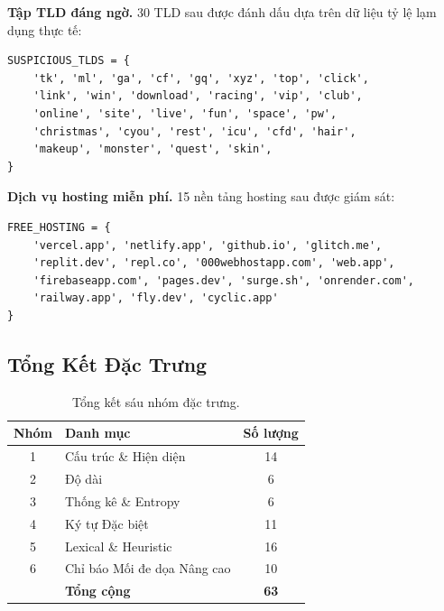 \documentclass[a4paper,12pt]{article}
\begin{document}
\textbf{Tập TLD đáng ngờ.} 30 TLD sau được đánh dấu dựa trên dữ liệu tỷ lệ lạm dụng thực tế:

\begin{lstlisting}[caption={Tập top-level domain đáng ngờ}]
SUSPICIOUS_TLDS = {
    'tk', 'ml', 'ga', 'cf', 'gq', 'xyz', 'top', 'click',
    'link', 'win', 'download', 'racing', 'vip', 'club',
    'online', 'site', 'live', 'fun', 'space', 'pw',
    'christmas', 'cyou', 'rest', 'icu', 'cfd', 'hair',
    'makeup', 'monster', 'quest', 'skin',
}
\end{lstlisting}

\textbf{Dịch vụ hosting miễn phí.} 15 nền tảng hosting sau được giám sát:

\begin{lstlisting}[caption={Tập domain dịch vụ hosting miễn phí được giám sát}]
FREE_HOSTING = {
    'vercel.app', 'netlify.app', 'github.io', 'glitch.me',
    'replit.dev', 'repl.co', '000webhostapp.com', 'web.app',
    'firebaseapp.com', 'pages.dev', 'surge.sh', 'onrender.com',
    'railway.app', 'fly.dev', 'cyclic.app'
}
\end{lstlisting}

\subsection{Tổng Kết Đặc Trưng}

\begin{table}[H]
\centering
\caption{Tổng kết sáu nhóm đặc trưng.}
\label{tab:feat_summary}
\begin{tabular}{clc}
\toprule
\textbf{Nhóm} & \textbf{Danh mục} & \textbf{Số lượng} \\
\midrule
1 & Cấu trúc \& Hiện diện          & 14 \\
2 & Độ dài                          & 6 \\
3 & Thống kê \& Entropy            & 6 \\
4 & Ký tự Đặc biệt                 & 11 \\
5 & Lexical \& Heuristic           & 16 \\
6 & Chỉ báo Mối đe dọa Nâng cao   & 10 \\
\midrule
  & \textbf{Tổng cộng}             & \textbf{63} \\
\bottomrule
\end{tabular}
\end{table}
\end{document}
